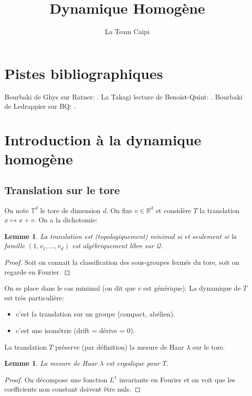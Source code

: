 \documentclass[12pt, a4paper,oneside]{amsart} %
\title{Dynamique Homogène}
\author{La Team Caipi}
\newtheorem{lemma}[theorem]{Lemme}
\theoremstyle{definition}
\theoremstyle{remark}
\theoremstyle{remark}
\newcommand\R{\mathbb{R}}
\newcommand\T{\mathbb{T}}
\begin{document}
\maketitle


\tableofcontents

\section{Pistes bibliographiques}
\label{sec:bibli}

Bourbaki de Ghys sur Ratner:
\cite{ghysDynamiqueFlotsUnipotentsa}.
La Takagi lecture de Benoist-Quint:
\cite{benoistIntroductionRandomWalks2012}.
Bourbaki de Ledrappier sur BQ:
\cite{ledrappierMesuresStationairesEspaces}.

\section{Introduction à la dynamique homogène}
\label{sec:intro}

\subsection{Translation sur le tore}
\label{sub:transl_tore}

On note $ \T^{d} $ le tore de dimension $ d $.
On fixe $ v \in \R^{d} $ et considère $ T $
la translation $ x \mapsto x + v $.
On a la dichotomie:
\begin{lemma}
	La translation est (topologiquement) minimal
	si et seulement si
	la famille
	$ (1, v_{1}, \dots, v_{d}) $
	est algébriquement libre sur $ \mathcal{Q} $.
\end{lemma}
\begin{proof}
	Soit on connait la classification
	des sous-groupes fermés du tore,
	soit on regarde en Fourier.
\end{proof}

On se place dans le cas minimal
(on dit que $ v $ est générique).
La dynamique de $ T $ est très particulière:
\begin{itemize}
	\item c'est la translation sur un groupe
		(compact, abélien).
	\item c'est une isométrie (drift = dérive = 0).
\end{itemize}

La translation $ T $ préserve (par définition)
la mesure de Haar $ \lambda $ sur le tore.
\begin{lemma}
	La mesure de Haar $ \lambda $
	est ergodique pour $ T $.
\end{lemma}
\begin{proof}
	On décompose une fonction $ L^{1} $ 
	invariante en Fourier
	et on voit que les coefficients
	non constant doivent être nuls.
\end{proof}
\end{document}
